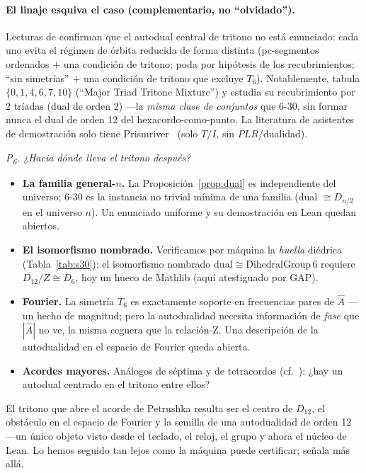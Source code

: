 \documentclass[11pt]{article}
\newcommand{\Dgrp}[1]{D_{#1}}
\newcommand{\Ahat}{\hat{A}}
\newcommand{\question}[1]{\smallskip\noindent\textit{#1}\smallskip}
\begin{document}
\paragraph{El linaje esquiva el caso (complementario, no ``olvidado'').} Lecturas de \cite{FS,FN11,FN25}
confirman que el autodual central de tritono no está enunciado: cada uno evita el régimen de órbita
reducida de forma distinta (pc-segmentos ordenados $+$ una condición de tritono; poda por hipótesis de
los recubrimientos; ``sin simetrías'' $+$ una condición de tritono que excluye $T_6$). Notablemente,
\cite{FN11} tabula $\{0,1,4,6,7,10\}$ (``Major Triad Tritone Mixture'') y estudia su recubrimiento por
$2$ tríadas (dual de orden $2$) ---la \emph{misma clase de conjuntos} que 6-30, sin formar nunca el dual
de orden 12 del hexacordo-como-punto. La literatura de asistentes de demostración solo tiene
Prismriver~\cite{Prism} (solo $T/I$, sin $PLR$/dualidad).

\question{P\textsubscript{6}. ¿Hacia dónde lleva el tritono después?}

\begin{itemize}\itemsep2pt
  \item \textbf{La familia general-$n$.} La Proposición~\ref{prop:dual} es independiente del universo;
        6-30 es la instancia no trivial mínima de una familia (dual $\cong\Dgrp{n/2}$ en el universo
        $n$). Un enunciado uniforme y su demostración en Lean quedan abiertos.
  \item \textbf{El isomorfismo nombrado.} Verificamos por máquina la \emph{huella} diédrica
        (Tabla~\ref{tab:s30}); el isomorfismo nombrado $\mathrm{dual}\cong\mathrm{DihedralGroup}\,6$
        requiere $\Dgrp{12}/Z\cong\Dgrp{6}$, hoy un hueco de Mathlib (aquí atestiguado por GAP).
  \item \textbf{Fourier.} La simetría $T_6$ es exactamente soporte en frecuencias pares de $\Ahat$ ---un
        hecho de magnitud; pero la autodualidad necesita información de \emph{fase} que $|\Ahat|$ no ve,
        la misma ceguera que la relación-Z. Una descripción de la autodualidad en el espacio de Fourier
        queda abierta.
  \item \textbf{Acordes mayores.} Análogos de séptima y de tetracordos (cf.\ \cite{FN25}): ¿hay un
        autodual centrado en el tritono entre ellos?
\end{itemize}

El tritono que abre el acorde de Petrushka resulta ser el centro de $\Dgrp{12}$, el obstáculo en el
espacio de Fourier y la semilla de una autodualidad de orden 12 ---un único objeto visto desde el
teclado, el reloj, el grupo y ahora el núcleo de Lean. Lo hemos seguido tan lejos como la máquina puede
certificar; señala más allá.
\end{document}

